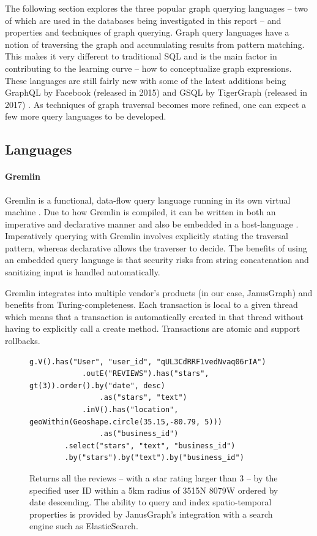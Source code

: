 The following section explores the three popular graph querying languages -- two of which are used in the databases being investigated in this report -- and properties and techniques of graph querying. Graph query languages have a notion of traversing the graph and accumulating results from pattern matching. This makes it very different to traditional SQL and is the main factor in contributing to the learning curve -- how to conceptualize graph expressions. These languages are still fairly new with some of the latest additions being GraphQL by Facebook (released in 2015) \cite{graphqlhome} and GSQL by TigerGraph (released in 2017) \cite{tgv1docs}. As techniques of graph traversal becomes more refined, one can expect a few more query languages to be developed.

\subsection{Languages}
\label{subsec:lang}

\paragraph{Gremlin}

Gremlin is a functional, data-flow query language running in its own virtual machine \cite{gremlin-tinkerpop}. Due to how Gremlin is compiled, it can be written in both an imperative and declarative manner and also be embedded in a host-language \cite{tinkerpop-docs}. Imperatively querying with Gremlin involves explicitly stating the traversal pattern, whereas declarative allows the traverser to decide. The benefits of using an embedded query language is that security risks from string concatenation and sanitizing input is handled automatically.

Gremlin integrates into multiple vendor's products (in our case, JanusGraph) and benefits from Turing-completeness. Each transaction is local to a given thread which means that a transaction is automatically created in that thread without having to explicitly call a create method. Transactions are atomic and support rollbacks.

\begin{figure}[h]
    \centering
    \begin{lstlisting}[language=gremlin]
    g.V().has("User", "user_id", "qUL3CdRRF1vedNvaq06rIA")
            .outE("REVIEWS").has("stars", gt(3)).order().by("date", desc)
                .as("stars", "text")
            .inV().has("location", geoWithin(Geoshape.circle(35.15,-80.79, 5)))
                .as("business_id")
        .select("stars", "text", "business_id")
        .by("stars").by("text").by("business_id")
    \end{lstlisting}
    \caption{Returns all the reviews -- with a star rating larger than 3 -- by the specified user ID within a 5km radius of 35\degree 15N 80\degree 79W ordered by date descending. The ability to query and index spatio-temporal properties is provided by JanusGraph's integration with a search engine such as ElasticSearch.}
    \label{lst:gremlin-example-1}
\end{figure}

